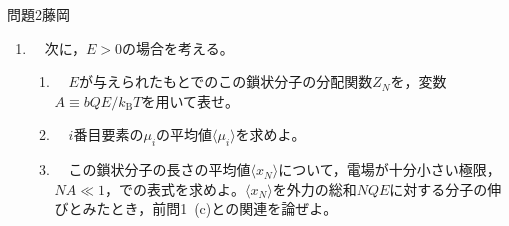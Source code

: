 \documentclass[fleqn]{jbook}
\def\B{\mathrm B}
\begin{document}
\begin{question}{問題2}{藤岡}
\begin{enumerate}
    \item 　次に，$E>0$の場合を考える。\\
    
    \begin{enumerate}
        \item 　$E$が与えられたもとでのこの鎖状分子の分配関数$Z_N$を，変数$A\equiv bQE/k_\B T$を用いて表せ。\\
        
        \item 　$i$番目要素の$\mu_i$の平均値$\langle \mu_i\rangle$を求めよ。\\
        
        \item 　この鎖状分子の長さの平均値$\langle x_N\rangle$について，電場が十分小さい極限，$NA\ll 1$，での表式を求めよ。$\langle x_N\rangle$を外力の総和$NQE$に対する分子の伸びとみたとき，前問1~(c)との関連を論ぜよ。\\
\end{enumerate}

\end{enumerate}



\end{question}

\end{document}
